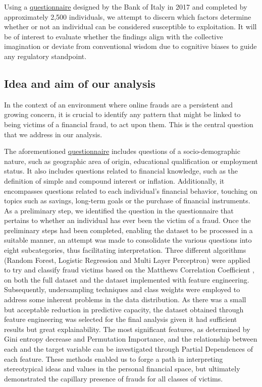 \documentclass[a4paper,11pt]{article}
\begin{document}
Using a \href{https://www.bancaditalia.it/statistiche/tematiche/indagini-famiglie-imprese/alfabetizzazione/Data-description.pdf?language_id=1}{questionnaire} designed by the Bank of Italy \cite{BdI} in 2017 and completed by approximately 2,500 individuals, we attempt to discern which factors determine whether or not an individual can be considered susceptible to exploitation. It will be of interest to evaluate whether the findings align with the collective imagination or deviate from conventional wisdom due to cognitive biases to guide any regulatory standpoint.

\subsection{Idea and aim of our analysis}

In the context of an environment where online frauds are a persistent and growing concern, it is crucial to identify any pattern that might be linked to being victims of a financial fraud, to act upon them. This is the central question that we address in our analysis. 

The aforementioned \href{https://www.bancaditalia.it/statistiche/tematiche/indagini-famiglie-imprese/alfabetizzazione/Data-description.pdf?language_id=1}{questionnaire} includes questions of a socio-demographic nature, such as geographic area of origin, educational qualification or employment status. It also includes questions related to financial knowledge, such as the definition of simple and compound interest or inflation. Additionally, it encompasses questions related to each individual's financial behavior, touching on topics such as savings, long-term goals or the purchase of financial instruments. \\

As a preliminary step, we identified the question in the questionnaire that pertains to whether an individual has ever been the victim of a fraud. 
Once the preliminary steps had been completed, enabling the dataset to be processed in a suitable manner, an attempt was made to consolidate the various questions into eight subcategories, thus facilitating interpretation. Three different algorithms (Random Forest, Logistic Regression and Multi Layer Perceptron) were applied to try and classify fraud victims based on the Matthews Correlation Coefficient \cite{BioData}, \cite{BMC} on both the full dataset and the dataset implemented with feature engineering. Subsequently, undersampling techniques and class weights were employed to address some inherent problems in the data distribution.
As there was a small but acceptable reduction in predictive capacity, the dataset obtained through feature engineering was selected for the final analysis given it had sufficient results but great explainability. The most significant features, as determined by Gini entropy decrease and Permutation Importance, and the relationship between each and the target variable can be investigated through Partial Dependences of each feature. These methods enabled us to forge a path in interpreting stereotypical ideas and values in the personal financial space, but ultimately demonstrated the capillary presence of frauds for all classes of victims. \\
\end{document}
